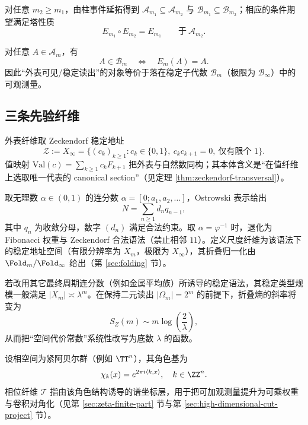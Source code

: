 对任意 $m_2\ge m_1$，由柱事件延拓得到 $\mathcal{A}_{m_1}\subseteq \mathcal{A}_{m_2}$ 与 $\mathcal{B}_{m_1}\subseteq \mathcal{B}_{m_2}$；相应的条件期望满足塔性质
\[
E_{m_1}\circ E_{m_2}=E_{m_1}\qquad\text{于}\ \mathcal{A}_{m_2}.
\]

\begin{remark}[本体可见性判据]\label{rem:pom-visible-criterion}
对任意 $A\in\mathcal{A}_m$，有
\[
A\in\mathcal{B}_m\quad\Longleftrightarrow\quad E_m(A)=A.
\]
因此“外表可见/稳定读出”的对象等价于落在稳定子代数 $\mathcal{B}_m$（极限为 $\mathcal{B}_\infty$）中的可观测量。
\end{remark}

\subsection{三条先验纤维}\label{subsec:pom-fibers}


\begin{definition}\label{def:pom-observable-fiber}
外表纤维取 Zeckendorf 稳定地址
\[
\mathcal Z:=X_\infty=\{(c_k)_{k\ge 1}: c_k\in\{0,1\},\ c_kc_{k+1}=0,\ \text{仅有限个 }1\}.
\]
值映射 $\mathrm{Val}(c)=\sum_{k\ge 1}c_kF_{k+1}$ 把外表与自然数同构；其本体含义是“在值纤维上选取唯一代表的 canonical section”（见定理 \ref{thm:zeckendorf-transversal}）。
\end{definition}

\begin{definition}\label{def:pom-scale-fiber}
取无理数 $\alpha\in(0,1)$ 的连分数 $\alpha=[0;a_1,a_2,\dots]$，Ostrowski 表示给出
\[
N=\sum_{n\ge 1} d_n q_{n-1},
\]
其中 $q_n$ 为收敛分母，数字 $(d_n)$ 满足合法约束。取 $\alpha=\varphi^{-1}$ 时，退化为 Fibonacci 权重与 Zeckendorf 合法语法（禁止相邻 $11$）。定义尺度纤维为该语法下的稳定地址空间（有限分辨率为 $X_m$，极限为 $X_\infty$），其折叠归一化由 $\Fold_m/\Fold_\infty$ 给出（第 \ref{sec:folding} 节）。
\end{definition}

\begin{remark}[更换尺度的代价斜率]\label{rem:pom-scale-slope}
若改用其它最终周期连分数（例如金属平均族）所诱导的稳定语法，其稳定类型规模一般满足 $|X_m|\asymp \lambda^m$。在保持二元读出 $|\Omega_m|=2^m$ 的前提下，折叠熵的斜率将变为
\[
S_Z(m)\sim m\log\!\left(\frac{2}{\lambda}\right),
\]
从而把“空间代价常数”系统性改写为底数 $\lambda$ 的函数。
\end{remark}

\begin{definition}\label{def:pom-phase-fiber}
设相空间为紧阿贝尔群（例如 $\TT^n$），其角色基为
\[
\chi_k(x)=e^{2\pi i\langle k,x\rangle},\quad k\in\ZZ^n.
\]
相位纤维 $\mathcal{T}$ 指由该角色结构诱导的谱坐标层，用于把可加观测量提升为可乘权重与卷积对角化（见第 \ref{sec:zeta-finite-part} 节与第 \ref{sec:high-dimensional-cut-project} 节）。
\end{definition}

